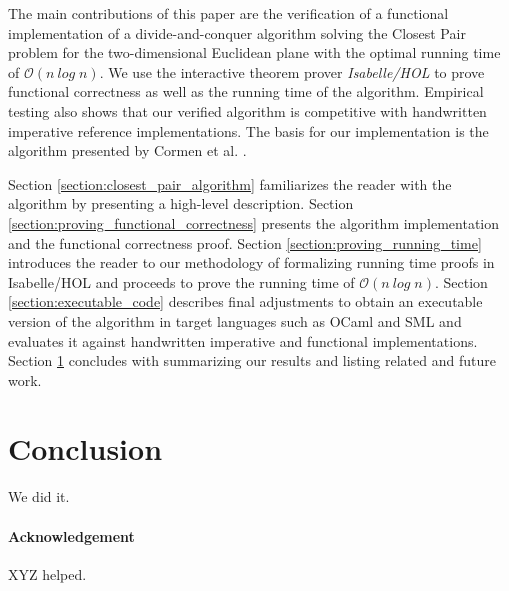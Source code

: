 \documentclass{llncs}
\begin{document}
The main contributions of this paper are the verification of a functional implementation of a
divide-and-conquer algorithm solving the Closest Pair problem for the two-dimensional Euclidean plane
with the optimal running time of $\mathcal{O}(n\ \mathit{log}\;n)$. We use the interactive theorem 
prover \textit{Isabelle/HOL} \cite{LNCS2283,Concrete} to prove functional correctness as well as the 
running time of the algorithm. Empirical testing also shows that our verified algorithm is 
competitive with handwritten imperative reference implementations. The basis for our implementation 
is the algorithm presented by Cormen et al. \cite{Introduction-to-Algorithms:2009}.

Section \ref{section:closest_pair_algorithm} familiarizes the reader with the algorithm by presenting a
high-level description. Section \ref{section:proving_functional_correctness} presents the algorithm
implementation and the functional correctness proof. Section \ref{section:proving_running_time} introduces
the reader to our methodology of formalizing running time proofs in Isabelle/HOL and proceeds to prove 
the running time of $\mathcal{O}(n\ \mathit{log}\;n)$. Section \ref{section:executable_code}
describes final adjustments to obtain an executable version of the algorithm in target languages
such as OCaml and SML and evaluates it against handwritten imperative and functional implementations. 
Section \ref{section:conclusion} concludes with summarizing our results and listing related and future work.



\section{Conclusion} \label{section:conclusion}

We did it.

\paragraph{Acknowledgement}
XYZ helped.



\end{document}
